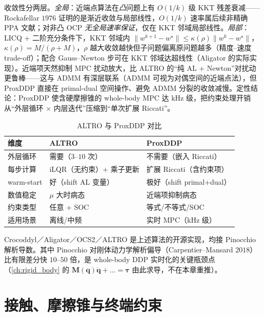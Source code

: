 收敛性分两层。\emph{全局}：近端点算法在\emph{凸}问题上有 $O(1/k)$ 级 KKT 残差衰减——Rockafellar $1976$ 证明的是渐近收敛与局部线性，$O(1/k)$ 速率属后续非精确 PPA 文献\cite{rockafellar1976proximal}；对非凸 OCP \emph{无全局速率保证}，仅在 KKT 邻域局部线性。\emph{局部}：LICQ + 二阶充分条件下，KKT 邻域内 $\|w^{k+1}-w^\star\|\le\kappa(\rho)\|w^k-w^\star\|$，$\kappa(\rho)=M/(\rho+M)$，$\rho$ 越大收敛越快但子问题偏离原问题越多（精度--速度 trade-off）；配合 Gauss--Newton 步可在 KKT 邻域达超线性（Aligator 的实际实现）。近端项天然抑制 MPC 扰动放大，比 ALTRO 的“纯 AL + Newton”对扰动更鲁棒——这与 ADMM 有深层联系（ADMM 可视为对偶空间的近端点法），但 ProxDDP 直接在 primal-dual 空间操作、避免 ADMM 分裂的收敛减慢。定性结论：ProxDDP 使含硬摩擦锥的 whole-body MPC 达 kHz 级，把约束处理开销从“外层循环 $\times$ 内层迭代”压缩到“单次扩展 Riccati”。

\begin{table}[H]\centering\small
\caption{ALTRO 与 ProxDDP 对比}
\label{tab:ddp-altro-prox}
\begin{tabular}{lll}
\toprule
维度 & ALTRO & ProxDDP \\
\midrule
外层循环 & 需要（$3$--$10$ 次） & 不需要（嵌入 Riccati）\\
每步计算 & iLQR（无约束）+ 乘子更新 & 扩展 Riccati（含约束项）\\
warm-start & 好（shift AL 变量） & 极好（shift primal+dual）\\
数值稳定 & $\mu$ 大时病态 & 近端项抑制病态 \\
约束类型 & 任意 + SOC & 等式/不等式/SOC \\
适用场景 & 离线/中频 & 实时 MPC（kHz 级）\\
\bottomrule
\end{tabular}
\end{table}

\begin{remark}
Crocoddyl／Aligator／OCS2／ALTRO 是上述算法的开源实现，均接 Pinocchio 解析导数。其中 Pinocchio 对刚体动力学解析偏导（Carpentier--Mansard $2018$\cite{carpentier2018derivatives}）比有限差分快 $10$--$50$ 倍，是 whole-body DDP 实时化的关键瓶颈点（\cref{ch:rigid_body} 的 $\mathbf{M}(\mathbf{q})\ddot{\mathbf{q}}+\dots=\boldsymbol{\tau}$ 由此求导，不在本章重推）。
\end{remark}

\section{接触、摩擦锥与终端约束}
\label{sec:ddp-contact}

